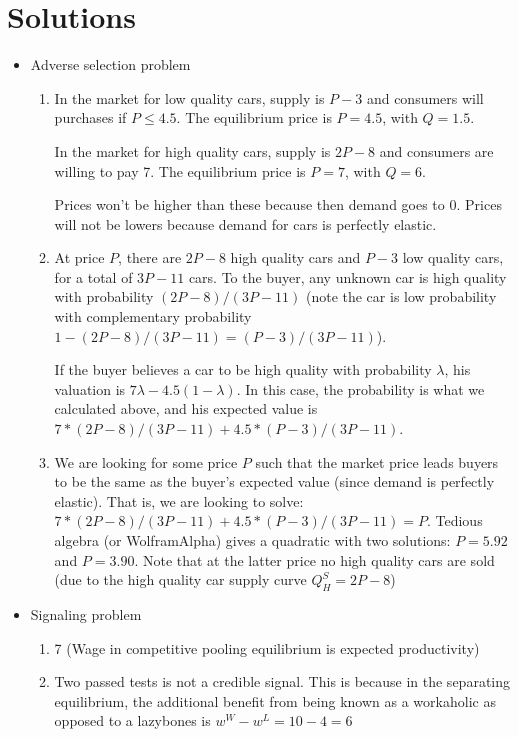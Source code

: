 \documentclass[letter,12pt]{article}
\begin{document}
\section{Solutions}

\begin{itemize}
	\item Adverse selection problem
	\begin{enumerate}
		\item In the market for low quality cars, supply is $P-3$ and consumers will purchases if $P\leq4.5$. The equilibrium price is $P=4.5$, with $Q=1.5$.
		
		In the market for high quality cars, supply is $2P-8$ and consumers are willing to pay 7. The equilibrium price is $P=7$, with $Q=6$.
		
		Prices won't be higher than these because then demand goes to 0. Prices will not be lowers because demand for cars is perfectly elastic.
		
		\item At price $P$, there are $2P-8$ high quality cars and $P-3$ low quality cars, for a total of $3P-11$ cars. To the buyer, any unknown car is high quality with probability $(2P-8)/(3P-11)$ (note the car is low probability with complementary probability $1-(2P-8)/(3P-11)=(P-3)/(3P-11)$).
		
		If the buyer believes a car to be high quality with probability $\lambda$, his valuation is $7\lambda - 4.5(1-\lambda)$. In this case, the probability is what we calculated above, and his expected value is $7*(2P-8)/(3P-11)+4.5*(P-3)/(3P-11)$.
		
		\item We are looking for some price $P$ such that the market price leads buyers to be the same as the buyer's expected value (since demand is perfectly elastic). That is, we are looking to solve: $7*(2P-8)/(3P-11)+4.5*(P-3)/(3P-11)=P$. Tedious algebra (or WolframAlpha) gives a quadratic with two solutions: $P=5.92$ and $P=3.90$. Note that at the latter price no high quality cars are sold (due to the high quality car supply curve $Q^S_H=2P-8$)
		
		
	\end{enumerate}
	\item Signaling problem
	\begin{enumerate}
		\item 7 (Wage in competitive pooling equilibrium is expected productivity)
		\item Two passed tests is not a credible signal. This is because in the separating equilibrium,
		the additional benefit from being known as a workaholic as opposed to a lazybones is $w^W-w^L = 10 − 4 = 6$
		

\end{enumerate}
\end{itemize}
\end{document}
